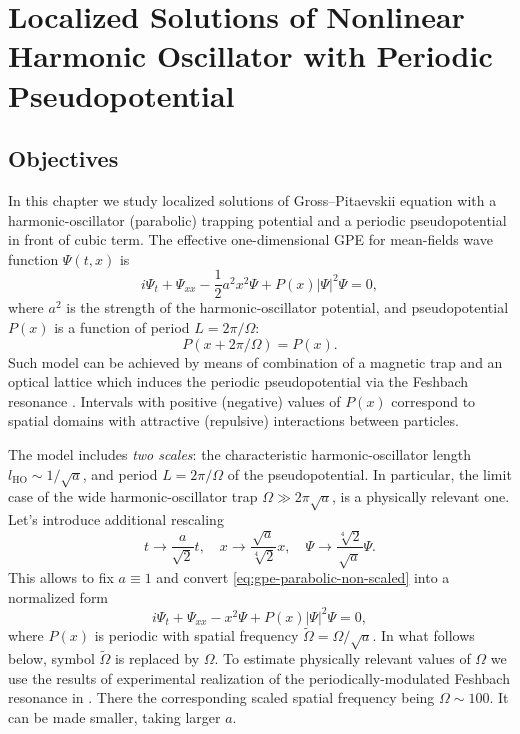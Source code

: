 \chapter{Localized Solutions of Nonlinear Harmonic Oscillator with Periodic Pseudopotential}
\label{chapter:IV}

\section{Objectives}

In this chapter we study localized solutions of Gross--Pitaevskii equation with a harmonic-oscillator (parabolic) trapping potential and a periodic pseudopotential in front of cubic term.
The effective one-dimensional GPE for mean-fields wave function $\Psi(t, x)$ is
\begin{equation}
	i \Psi_t + \Psi_{xx} - \dfrac{1}{2} a^2 x^2 \Psi + P(x) |\Psi|^2 \Psi = 0,
\label{eq:gpe-parabolic-non-scaled}
\end{equation}
where $a^2$ is the strength of the harmonic-oscillator potential, and pseudopotential $P(x)$ is a function of period $L = 2 \pi / \Omega$:
\begin{equation}
	P(x + 2 \pi / \Omega) = P(x).
\end{equation}
Such model can be achieved by means of combination of a magnetic trap and an optical lattice which induces the periodic pseudopotential via the Feshbach resonance \cite{SakaguchiMalomed2010}.
Intervals with positive (negative) values of $P(x)$ correspond to spatial domains with attractive (repulsive) interactions between particles.

The model includes {\it two scales}: the characteristic harmonic-oscillator length $l_{\mathrm{HO}} \sim 1 / \sqrt{a}$, and period $L = 2 \pi / \Omega$ of the pseudopotential.
In particular, the limit case of the wide harmonic-oscillator trap $\Omega \gg 2 \pi \sqrt{a}$, is a physically relevant one.
Let's introduce additional rescaling
\begin{equation}
	t \to \dfrac{a}{\sqrt{2}} t, \quad x \to \dfrac{\sqrt{a}}{\sqrt[4]{2}} x, \quad \Psi \to \dfrac{\sqrt[4]{2}}{\sqrt{a}} \Psi.
\end{equation}
This allows to fix $a \equiv 1$ and convert \eqref{eq:gpe-parabolic-non-scaled} into a normalized form
\begin{equation}
	i \Psi_t + \Psi_{xx} - x^2 \Psi + P(x) |\Psi|^2 \Psi = 0,
\label{eq:gpe-parabolic}
\end{equation}
where $P(x)$ is periodic with spatial frequency $\widetilde{\Omega} = \Omega / \sqrt{a}$.
In what follows below, symbol $\widetilde{\Omega}$ is replaced by $\Omega$.
To estimate physically relevant values of $\Omega$ we use the results of experimental realization of the periodically-modulated Feshbach resonance in \cite{YamazakiTaieSugawaTakahashi}.
There the corresponding scaled spatial frequency being $\Omega \sim 100$.
It can be made smaller, taking larger $a$.

